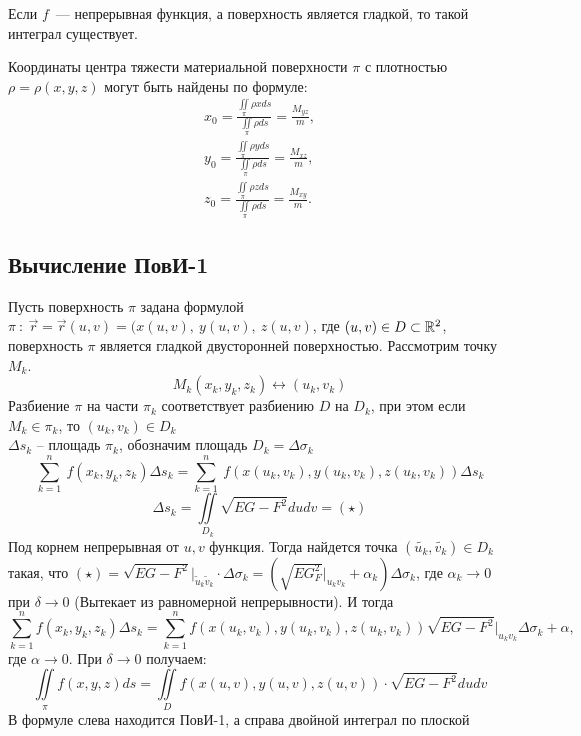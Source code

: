 \documentclass[../../main.tex]{subfiles}
\begin{document}
	Если $f$~--- непрерывная функция, а поверхность является гладкой, то такой интеграл существует.

	Координаты центра тяжести материальной поверхности $\pi$ с плотностью $\rho =
	 \rho(x,y,z)$ могут быть найдены по формуле: 
	\begin{gather*}x_0 = \frac{\iint \limits_\pi \rho  x ds}{\iint \limits_\pi \rho ds} =
	 \frac{M_{yz}}{m}, \\
	y_0 = \frac{\iint \limits_\pi \rho  y ds}{\iint \limits_\pi \rho ds} =
	 \frac{M_{xz}}{m}, \\
	z_0 = \frac{\iint \limits_\pi \rho  z ds}{\iint \limits_\pi \rho ds} =
	 \frac{M_{xy}}{m}.
	 \end{gather*}
	
	\subsection{Вычисление ПовИ-1}
	Пусть поверхность $\pi$ задана формулой $\pi \ : \ \overrightarrow{r} =
	 \overrightarrow{r}(u, v) = (x(u,v), \ y(u,v), \ z(u, v)$, где $(u, v) \in D
	  \subset \mathbb{R}^2$, поверхность $\pi$ является гладкой двусторонней
	   поверхностью. Рассмотрим точку $M_k$.
	\[M_k(x_k, y_k, z_k) \leftrightarrow (u_k, v_k)\]
	Разбиение $\pi$ на части $\pi_k$ соответствует разбиению $D$ на $D_k$, при 
	этом
	 если $M_k \in \pi_k$, то $(u_k, v_k) \in D_k$\\
	$\Delta s_k$ \--- площадь $\pi_k$, обозначим площадь $D_k  = \Delta\sigma 
	_k$\\
	\[\sum^{n}_{k=1} \ f(x_k, y_k, z_k)\Delta s_k = \sum^{n}_{k=1} \ f(x(u_k, 
	v_k),
	 y(u_k, v_k), z(u_k, v_k))\Delta s_k \]
	\[\Delta s_k = \iint \limits_{D_k}\sqrt{EG - F^2}dudv = (\star)  \]
	Под корнем непрерывная от $u, v$ функция. Тогда найдется точка $(\tilde{u_k},
	 \tilde{v_k}) \in D_k$ такая, что $(\star) = \sqrt{EG -F^2} \big|_{\tilde{u}_k
	  \tilde{v}_k} \cdot \Delta \sigma_k = (\sqrt{EG _F^2} \big|_{u_kv_k} 
	  +\alpha_k)
   \Delta \sigma_k$, где $\alpha_k \to 0$ при $\delta \to 0$ (Вытекает из 
   равномерной
    непрерывности). И тогда 
	\[ \sum_{k=1}^{n} f(x_k,y_k, z_k) \Delta s_k = \sum_{k=1}^{n} f(x(u_k, v_k),
	 y(u_k, v_k), z(u_k, v_k)) \sqrt{EG - F^2}\big|_{u_k v_k} \Delta \sigma_k
	  +\alpha,\]
	где $\alpha \to 0$. При $\delta \to 0$ получаем:
	\begin{equation}
	\label{lec23-1}
	\iint \limits_{\pi} f(x,y,z)ds = \iint \limits_Df(x(u,v), y(u,v),z(u,v)) 
	\cdot \sqrt{EG - F^2} du dv
	\end{equation}
    В формуле слева находится ПовИ-1, а справа двойной интеграл по плоской 
\end{document}
